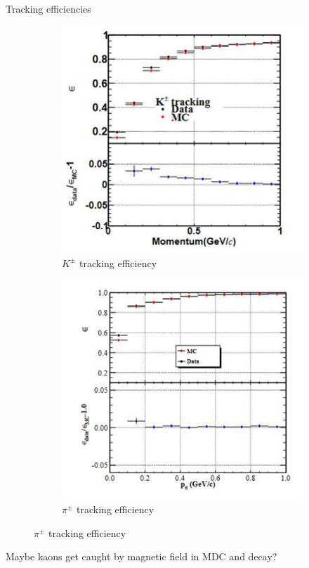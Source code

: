 \documentclass{beamer}
\begin{document}
\begin{frame}{Tracking efficiencies}
  \begin{figure}
    \centering
    \begin{subfigure}{0.49\textwidth}
      \centering
      \includegraphics[width=\textwidth]{Plots/KaonEfficiency.jpg}
      \caption{$K^\pm$ tracking efficiency}
    \end{subfigure}%
    \begin{subfigure}{0.49\textwidth}
      \centering
      \includegraphics[width=\textwidth]{Plots/PionEfficiency.jpg}
      \caption{$\pi^\pm$ tracking efficiency}
    \end{subfigure}
  \end{figure}
  \begin{center}
    Maybe kaons get caught by magnetic field in MDC and decay?
  \end{center}
\end{frame}
\end{document}
